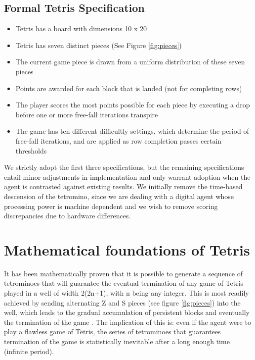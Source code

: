 \documentclass{rucsthesis}
\begin{document}
\subsection*{Formal Tetris Specification \citep{tetstand}} 
\begin{itemize}
\item{Tetris has a board with dimensions 10 x 20}
\item{Tetris has seven distinct pieces (See Figure \ref{fig:pieces})}
\item{The current game piece is drawn from a uniform distribution of these seven pieces}
\item{Points are awarded for each block that is landed (not for completing rows)}
\item{The player scores the most points possible for each piece by executing a drop before one or more free-fall iterations transpire}
\item{The game has ten different difficultly settings, which determine the period of free-fall iterations, and are applied as row completion passes certain thresholds}
\end{itemize}

We strictly adopt the first three specifications, but the remaining specifications entail minor adjustments in implementation and only warrant adoption when the agent is contrasted against existing results. We initially remove the time-based descension of the tetromino, since we are dealing with a digital agent whose processing power is machine dependent and we wish to remove scoring discrepancies due to hardware differences.

\section{Mathematical foundations of Tetris}

It has been mathematically proven \citep{mathproof,losetetris} that it is possible to generate a sequence of tetrominoes that will guarantee the eventual termination of any game of Tetris played in a well of width 2(2n+1), with n being any integer. This is most readily achieved by sending alternating Z and S pieces (see figure \ref{fig:pieces}) into the well, which leads to the gradual accumulation of persistent blocks and eventually the termination of the game \citep[Chpt. 5]{mathproof}. The implication of this is: even if the agent were to play a flawless game of Tetris, the series of tetrominoes that guarantees termination of the game is statistically inevitable after a long enough time (infinite period). 
\end{document}
